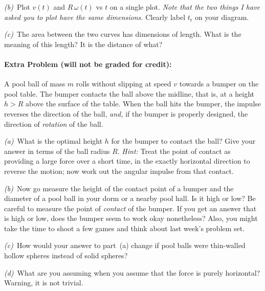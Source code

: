 \documentclass[12pt]{article}
\begin{document}
\textsl{(b)}~Plot $v(t)$ and $R\,\omega(t)$ vs $t$ on a single plot.
\emph{Note that the two things I have asked you to plot have the same
dimensions.}  Clearly label $t_\mathrm{r}$ on your diagram.

\textsl{(c)}~The area between the two curves has dimensions of length.
What is the meaning of this length?  It is the distance of what?

\paragraph{Extra Problem (will not be graded for credit):}%
A pool ball of mass $m$ rolls without slipping at speed $v$ towards a
bumper on the pool table.  The bumper contacts the ball above the
midline, that is, at a height $h>R$ above the surface of the table.
When the ball hits the bumper, the impulse reverses the direction of
the ball, \emph{and,} if the bumper is properly designed, the
direction of \emph{rotation} of the ball.

\textsl{(a)}~What is the optimal height $h$ for the bumper to contact
the ball?  Give your answer in terms of the ball radius $R$.
\emph{Hint:} Treat the point of contact as providing a large force
over a short time, in the exactly horizontal direction to reverse the
motion; now work out the angular impulse from that contact.

\textsl{(b)}~Now go measure the height of the contact point of a
bumper and the diameter of a pool ball in your dorm or a nearby pool
hall.  Is it high or low?  Be careful to measure the point of
\emph{contact} of the bumper.  If you get an answer that is high or
low, does the bumper seem to work okay nonetheless?  Also, you might
take the time to shoot a few games and think about last week's problem
set.

\textsl{(c)}~How would your answer to part~(a) change if pool balls
were thin-walled hollow spheres instead of solid spheres?

\textsl{(d)}~What are you assuming when you assume that the force is
purely horizontal?  Warning, it is not trivial.
\end{document}
